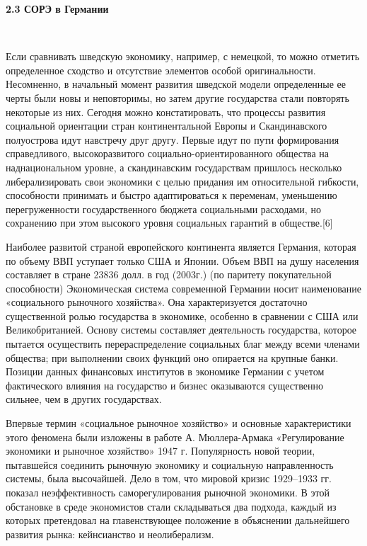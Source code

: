\documentclass[14pt,a4paper]{article}
\begin{document}
    \begin{center}
        \textbf{2.3 СОРЭ в Германии}
    \end{center}
    \\
    \par
    Если сравнивать шведскую экономику, например, с немецкой, то можно отметить определенное сходство и отсутствие элементов особой оригинальности.
    Несомненно, в начальный момент развития шведской модели определенные ее черты были новы и неповторимы, но затем другие государства стали повторять некоторые из них.
    Сегодня можно констатировать, что процессы развития социальной ориентации стран континентальной Европы и Скандинавского полуострова идут навстречу друг другу.
    Первые идут по пути формирования справедливого, высокоразвитого социально-ориентированного общества на наднациональном уровне, а скандинавским государствам пришлось несколько либерализировать свои экономики с целью придания им относительной гибкости, способности принимать и быстро адаптироваться к переменам, уменьшению перегруженности государственного бюджета социальными расходами, но сохранению при этом высокого уровня социальных гарантий в обществе.[6]
    \par
    Наиболее развитой страной европейского континента является Германия, которая по объему ВВП уступает только США и Японии.
    Объем ВВП на душу населения составляет в стране 23836 долл. в год (2003г.) (по паритету покупательной способности) Экономическая система современной Германии носит наименование «социального рыночного хозяйства».
    Она характеризуется достаточно существенной ролью государства в экономике, особенно в сравнении с США или Великобританией.
    Основу системы составляет деятельность государства, которое пытается осуществить перераспределение социальных благ между всеми членами общества; при выполнении своих функций оно опирается на крупные банки.
    Позиции данных финансовых институтов в экономике Германии с учетом фактического влияния на государство и бизнес оказываются существенно сильнее, чем в других государствах.
    \par
    Впервые термин «социальное рыночное хозяйство» и основные характеристики этого феномена были изложены в работе А. Мюллера-Армака «Регулирование экономики и рыночное хозяйство» 1947 г.
    Популярность новой теории, пытавшейся соединить рыночную экономику и социальную направленность системы, была высочайшей.
    Дело в том, что мировой кризис 1929–1933 гг. показал неэффективность саморегулирования рыночной экономики.
    В этой обстановке в среде экономистов стали складываться два подхода, каждый из которых претендовал на главенствующее положение в объяснении дальнейшего развития рынка: кейнсианство и неолиберализм.
\end{document}

